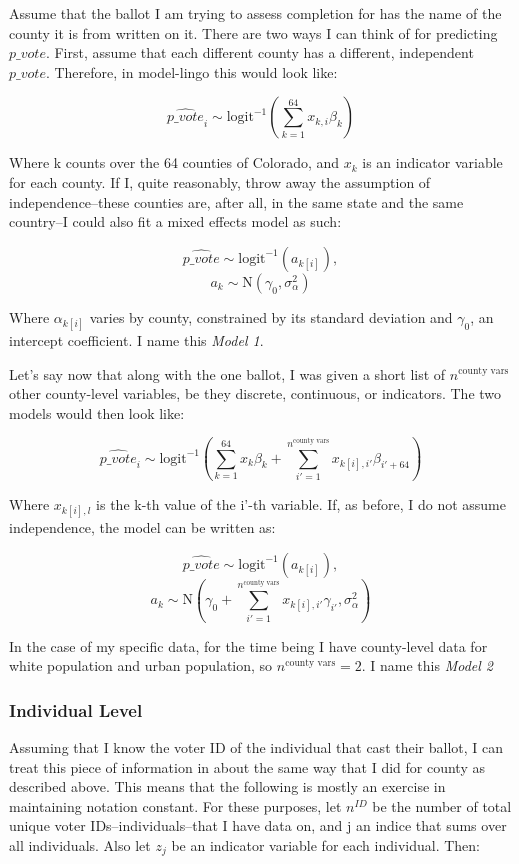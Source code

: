 \documentclass[12pt,twoside]{reedthesis}
\begin{document}
  Assume that the ballot I am trying to assess completion for has the name
  of the county it is from written on it. There are two ways I can think
  of for predicting \(p\_vote\). First, assume that each different county
  has a different, independent \(p\_vote\). Therefore, in model-lingo this
  would look like:
  
  \[\hat{p\_vote}_i \sim \text{logit}^{-1}(\sum_{k = 1}^{64}x_{k,i}\beta_{k})\]
  
  Where k counts over the 64 counties of Colorado, and \(x_{k}\) is an
  indicator variable for each county. If I, quite reasonably, throw away
  the assumption of independence--these counties are, after all, in the
  same state and the same country--I could also fit a mixed effects model
  as such:
  
  \[\hat{p\_vote} \sim \text{logit}^{-1}(a_{k[i]}), \]
  \[a_{k} \sim \text{N}(\gamma_0, \sigma_{\alpha}^2)\]
  
  Where \(\alpha_{k[i]}\) varies by county, constrained by its standard
  deviation and \(\gamma_0\), an intercept coefficient. I name this
  \emph{Model 1}.
  
  Let's say now that along with the one ballot, I was given a short list
  of \(n^{\text{county vars}}\) other county-level variables, be they
  discrete, continuous, or indicators. The two models would then look
  like:
  
  \[\hat{p\_vote}_i \sim \text{logit}^{-1}(\sum_{k = 1}^{64}x_{k}\beta_{k} + \sum_{i'=1}^{n^{\text{county vars}}}x_{k[i], i'}\beta_{i'+64})\]
  
  Where \(x_{k[i], l}\) is the k-th value of the i'-th variable. If, as
  before, I do not assume independence, the model can be written as:
  
  \[\hat{p\_vote} \sim \text{logit}^{-1}(a_{k[i]}), \]
  \[a_{k} \sim \text{N}(\gamma_0 + \sum_{i'=1}^{n^{\text{county vars}}}x_{k[i], i'}\gamma_{i'}, \sigma_{\alpha}^2)\]
  
  In the case of my specific data, for the time being I have county-level
  data for white population and urban population, so
  \(n^{\text{county vars}} = 2\). I name this \emph{Model 2}
  
  \subsubsection{Individual Level}\label{individual-level}
  
  Assuming that I know the voter ID of the individual that cast their
  ballot, I can treat this piece of information in about the same way that
  I did for county as described above. This means that the following is
  mostly an exercise in maintaining notation constant. For these purposes,
  let \(n^{ID}\) be the number of total unique voter
  IDs--individuals--that I have data on, and j an indice that sums over
  all individuals. Also let \(z_{j}\) be an indicator variable for each
  individual. Then:
  
\end{document}
